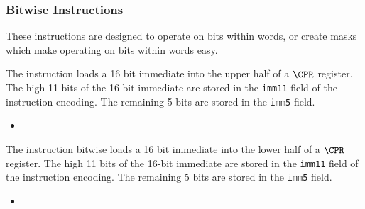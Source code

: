 \subsubsection{Bitwise Instructions}
\label{sec:bitwise-instructions}

These instructions are designed to operate on bits within words, or
create masks which make operating on bits within words easy.

{\iencluicr}
{
The  instruction loads a 16 bit immediate into the
upper half of a $\CPR$ register.
The high 11 bits of the 16-bit immediate are stored in the {\tt imm11}
field of the instruction encoding. The remaining 5 bits are stored
in the {\tt imm5} field.
}{
\begin{itemize}
\item {}
\end{itemize}
}{}


{\iencllicr}
{
The  instruction bitwise loads a 16 bit immediate into the
lower half of a $\CPR$ register. 
The high 11 bits of the 16-bit immediate are stored in the {\tt imm11}
field of the instruction encoding. The remaining 5 bits are stored
in the {\tt imm5} field.
}{
\begin{itemize}
\item {}
\end{itemize}
}{}

